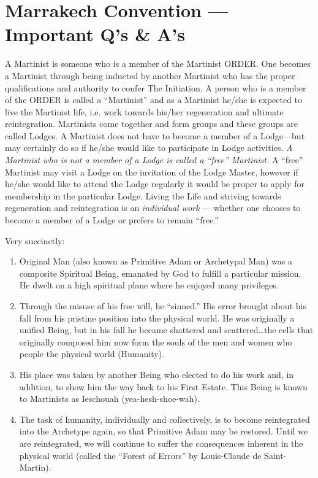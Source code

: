 \section{Marrakech Convention --- Important Q's \& A's}


A Martinist is someone who is a member of the Martinist ORDER. One becomes a Martinist through being inducted by another Martinist who has the proper qualifications and authority to confer The Initiation. A person who is a member of the ORDER is called a ``Martinist'' and as a Martinist he/she is expected to live the Martinist life, i.e. work towards his/her regeneration and ultimate reintegration. Martinists come together and form groups and these groups are called Lodges. A Martinist does not have to become a member of a Lodge—but may certainly do so if he/she would like to participate in Lodge activities. \textit{A Martinist who is not a member of a Lodge is called a ``free'' Martinist.} A ``free'' Martinist may visit a Lodge on the invitation of the Lodge Master, however if he/she would like to attend the Lodge regularly it would be proper to apply for membership in the particular Lodge. Living the Life and striving towards regeneration and reintegration is an \textit{individual work} --- whether one chooses to become a member of a Lodge or prefers to remain ``free.''


Very succinctly:

\begin{enumerate}[label = (\alph*)]
	\item Original Man (also known as Primitive Adam or Archetypal Man)
	was a composite Spiritual Being, emanated by God to fulfill a particular mission. He dwelt
	on a high spiritual plane where he enjoyed many privileges. 
	\item Through the misuse of his free will, he ``sinned.'' His error brought about his fall
	from his pristine position into the physical world. He was originally a unified Being, but in
	his fall he became shattered and scattered…the cells that originally composed him now form
	the souls of the men and women who people the physical world (Humanity).
	\item His place was taken by another Being who elected to do his work and, in
	addition, to show him the way back to his First Estate. This Being is known to Martinists as
	Ieschouah (yea-hesh-shoe-wah). 
	\item The task of humanity, individually and collectively, is to become reintegrated into
	the Archetype again, so that Primitive Adam may be restored. Until we are reintegrated, we
	will continue to suffer the consequences inherent in the physical world (called the ``Forest of
	Errors'' by Louis-Claude de Saint-Martin). 
\end{enumerate}

